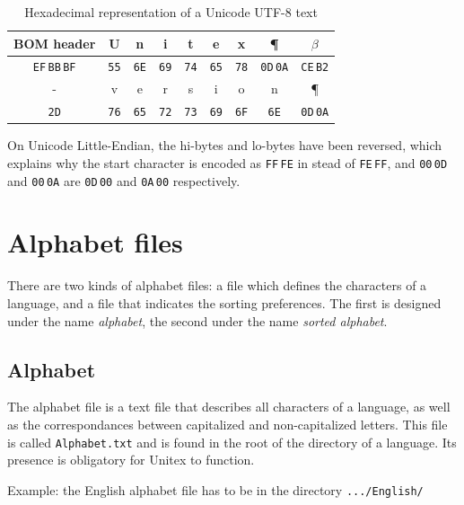 \bigskip
\begin{table}[h]
\begin{center}
\begin{tabular}{|c|c|c|c|c|c|c|c|c|}
\hline
BOM header & U & n & i & t & e & x & \P & $\beta$
\\
\hline
\verb+EF+\,\verb+BB+\,\verb+BF+ & \verb+55+ & \verb+6E+ & \verb+69+ & \verb+74+ & \verb+65+ & \verb+78+
& \verb+0D+\,\verb+0A+ & \verb+CE+\,\verb+B2+
\\
\hline
\hline
- & v & e & r & s & i & o & n & \P
\\
\hline
\verb+2D+ & \verb+76+ & \verb+65+ & \verb+72+ & \verb+73+ & \verb+69+ & \verb+6F+
& \verb+6E+ & \verb+0D+\,\verb+0A+
\\
\hline
\end{tabular}
\caption{Hexadecimal representation of a Unicode UTF-8 text}
\end{center}
\end{table}

\bigskip
\noindent On Unicode Little-Endian, the hi-bytes and lo-bytes have been reversed, which explains why the
start character is encoded as \verb+FF+\,\verb+FE+ in stead of \verb+FE+\,\verb+FF+, and
\verb+00+\,\verb+0D+ and \verb+00+\,\verb+0A+ are \verb+0D+\,\verb+00+ and \verb+0A+\,\verb+00+ respectively.



\section{Alphabet files}
There are two kinds of alphabet files: a file which defines the characters of a
language, and a file that indicates the sorting preferences. The first is
designed under the name \textit{alphabet}, the second under the name
\textit{sorted alphabet}.


\subsection{Alphabet}
The alphabet file is a text file that describes all characters of a language, as
well as the correspondances between capitalized and non-capitalized letters. This
file is called \verb+Alphabet.txt+  and is found
in the root of the directory of a language. Its presence is obligatory for Unitex
to function.

\bigskip
\noindent Example: the English alphabet file has to be in the directory
\verb+.../English/+

